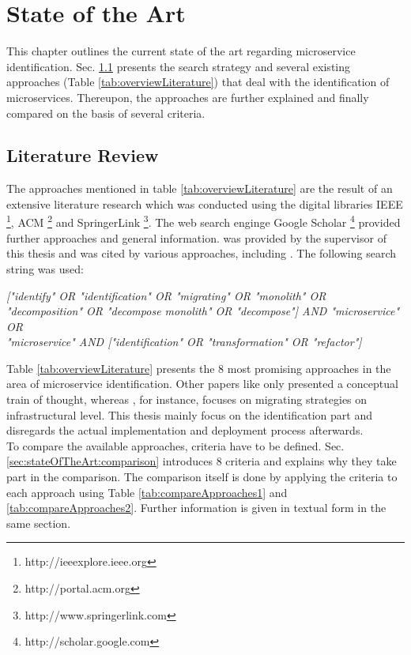 

\chapter{State of the Art}
\label{ch:StateOfTheArt}
This chapter outlines the current state of the art regarding microservice identification.  Sec. \ref{sec:StateOfTheArt:LiteratureReview} presents the search strategy and several existing approaches (Table \ref{tab:overviewLiterature}) that deal with the identification of microservices. Thereupon, the approaches are further explained and finally compared on the basis of several criteria.

\section{Literature Review}
\label{sec:StateOfTheArt:LiteratureReview}
The approaches mentioned in table \ref{tab:overviewLiterature} are the result of an extensive literature research which was conducted using the digital libraries IEEE \footnote{http://ieeexplore.ieee.org }, ACM \footnote{http://portal.acm.org} and SpringerLink \footnote{http://www.springerlink.com }. The web search enginge Google Scholar \footnote{http://scholar.google.com} provided further approaches and general information. \cite{FunctionalDecompositionHeinrich} was provided by the supervisor of this thesis and \cite{ServiceCutter} was cited by various approaches, including \cite{interfaceAnalysisBaresi}. The following search string was used: 

\vspace{1cm}
\begin{centering}
{\itshape
   ["identify" OR "identification" OR "migrating" OR "monolith" OR "decomposition" OR "decompose monolith"
  	OR "decompose"] AND  "microservice"  \\
  	   OR \\  "microservice"  AND ["identification" OR "transformation" OR "refactor"]
} \\

 
   
\end{centering}
\vspace{1cm}

\noindent
Table \ref{tab:overviewLiterature} presents the 8 most promising approaches in the area of microservice identification. Other papers like \cite{TowardsCloudGuiseppe} only presented a conceptual train of thought, whereas \cite{MigratingCloud}, for instance, focuses on migrating strategies on infrastructural level. This thesis mainly focus on the identification part and disregards the actual implementation and deployment process afterwards. \\
To compare the available approaches, criteria have to be defined. Sec.\ref{sec:stateOfTheArt:comparison} introduces 8 criteria and explains why they take part in the comparison. The comparison itself is done by applying the criteria to each approach using Table \ref{tab:compareApproaches1} and \ref{tab:compareApproaches2}. Further information is given in textual form in the same section.






